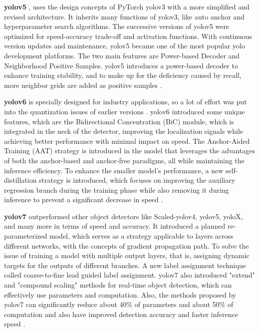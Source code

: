 \textbf{\gls{yolo}v5} \cite{ultralytics2024yolov5}, uses the design concepts of PyTorch \gls{yolo}v3 with a more simplified and revised architecture. It inherits many functions of \gls{yolo}v3, like auto anchor and hyperparameter search algorithms. The successive versions of \gls{yolo}v5 were optimized for speed-accuracy trade-off and activation functions. With continuous version updates and maintenance, \gls{yolo}v5 became one of the most popular \gls{yolo} development platforms. The two main features are Power-based Decoder and Neighborhood Positive Samples. \gls{yolo}v5 introduces a power-based decoder to enhance training stability, and to make up for the deficiency caused by recall, more neighbor grids are added as positive samples \cite{wang2024yolov1}.

\textbf{\gls{yolo}v6} \cite{ultralytics2024yolov6} is specially designed for industry applications, so a lot of effort was put into the quantization issues of earlier versions \cite{wang2024yolov1}. \gls{yolo}v6 introduced some unique features, which are the Bidirectional Concentration (BiC) module, which is integrated in the neck of the detector, improving the localization signals while achieving better performance with minimal impact on speed. The Anchor-Aided Training (AAT) strategy is introduced in the model that leverages the advantages of both the anchor-based and anchor-free paradigms, all while maintaining the inference efficiency. To enhance the smaller model's performance, a new self-distillation strategy is introduced, which focuses on improving the auxiliary regression branch during the training phase while also removing it during inference to prevent a significant decrease in speed \cite{ultralytics2024yolov6}.

\textbf{\gls{yolo}v7} \cite{ultralytics2024yolov7} outperformed other object detectors like Scaled-\gls{yolo}v4, \gls{yolo}v5, \gls{yolo}X, and many more in terms of speed and accuracy. It introduced a planned re-parameterized model, which serves as a strategy applicable to layers across different networks, with the concepts of gradient propagation path. To solve the issue of training a model with multiple output layers, that is, assigning dynamic targets for the outputs of different branches. A new label assignment technique called coarse-to-fine lead guided label assignment. \gls{yolo}v7 also introduced "extend" and "compound scaling" methods for real-time object detection, which can effectively use parameters and computation. Also, the methods proposed by \gls{yolo}v7 can significantly reduce about 40\% of parameters and about 50\% of computation and also have improved detection accuracy and faster inference speed \cite{ultralytics2024yolov6}.

